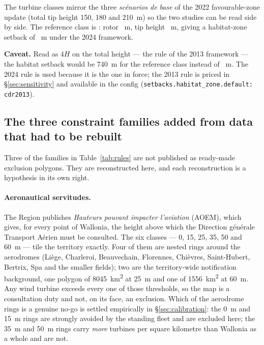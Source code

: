 \documentclass[11pt,a4paper]{article}
\newcommand{\caveat}[1]{\par\medskip\noindent\colorbox{warn!8}{%
  \begin{minipage}{\dimexpr\linewidth-2\fboxsep}\textbf{Caveat.} #1\end{minipage}}\par\medskip}
\begin{document}
The turbine classes mirror the three \emph{scénarios de base} of the 2022
favourable-zone update (total tip height 150, 180 and 210~m) so the two studies
can be read side by side. The reference class is : rotor
\RotorDiameter{}~m, tip height \TipHeight{}~m, giving a habitat-zone setback of
\HabitatSetback{}~m under the 2024 framework.

\caveat{Read as $4H$ on the total height --- the rule of the 2013 framework ---
the habitat setback would be \SI{740}{\metre} for the reference class instead of
\HabitatSetback{}~m. The 2024 rule is used because it is the one in force; the
2013 rule is priced in §\ref{sec:sensitivity} and available in the config
(\texttt{setbacks.habitat\_zone.default: cdr2013}).}

\subsection{The three constraint families added from data that had to be
rebuilt}\label{sec:newlayers}

Three of the families in Table~\ref{tab:rules} are not published as ready-made
exclusion polygons. They are reconstructed here, and each reconstruction is a
hypothesis in its own right.

\paragraph{Aeronautical servitudes.} The Region publishes
\emph{Hauteurs pouvant impacter l'aviation} (AOEM), which gives, for every point
of Wallonia, the height above which the Direction générale Transport Aérien must
be consulted. The six classes --- 0, 15, 25, 35, 50 and 60~m --- tile the
territory exactly. Four of them are nested rings around the aerodromes (Liège,
Charleroi, Beauvechain, Florennes, Chièvres, Saint-Hubert, Bertrix, Spa and the
smaller fields); two are the territory-wide notification background, one polygon
of \SI{8045}{\square\kilo\metre} at 25~m and one of
\SI{1556}{\square\kilo\metre} at 60~m. Any wind turbine exceeds every one of
those thresholds, so the map is a consultation duty and not, on its face, an
exclusion. Which of the aerodrome rings is a genuine no-go is settled
empirically in §\ref{sec:calibration}: the 0~m and 15~m rings are strongly
avoided by the standing fleet and are excluded here; the 35~m and 50~m rings
carry \emph{more} turbines per square kilometre than Wallonia as a whole and are
not.
\end{document}

